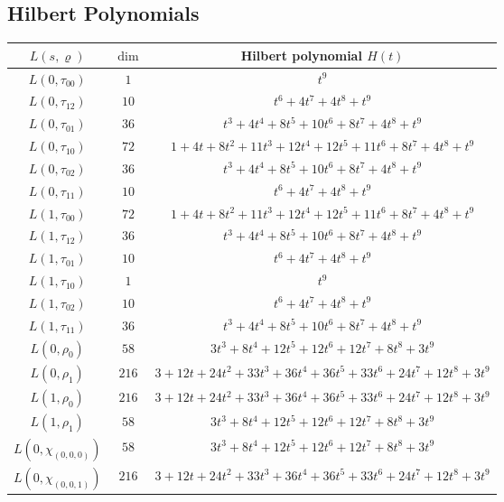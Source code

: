 \subsection{Hilbert Polynomials}

\begin{center}
\begin{tabular}{c|c|c}
\hline
$L(s,\varrho)$ & $\dim$ & Hilbert polynomial $H(t)$ \\
\hline
$L(0,\tau_{00})$ & $1$ & $t^{9}$ \\
$L(0,\tau_{12})$ & $10$ & $t^{6} + 4t^{7} + 4t^{8} + t^{9}$ \\
$L(0,\tau_{01})$ & $36$ & $t^{3} + 4t^{4} + 8t^{5} + 10t^{6} + 8t^{7} + 4t^{8} + t^{9}$ \\
$L(0,\tau_{10})$ & $72$ & $1 + 4t + 8t^{2} + 11t^{3} + 12t^{4} + 12t^{5} + 11t^{6} + 8t^{7} + 4t^{8} + t^{9}$ \\
$L(0,\tau_{02})$ & $36$ & $t^{3} + 4t^{4} + 8t^{5} + 10t^{6} + 8t^{7} + 4t^{8} + t^{9}$ \\
$L(0,\tau_{11})$ & $10$ & $t^{6} + 4t^{7} + 4t^{8} + t^{9}$ \\
$L(1,\tau_{00})$ & $72$ & $1 + 4t + 8t^{2} + 11t^{3} + 12t^{4} + 12t^{5} + 11t^{6} + 8t^{7} + 4t^{8} + t^{9}$ \\
$L(1,\tau_{12})$ & $36$ & $t^{3} + 4t^{4} + 8t^{5} + 10t^{6} + 8t^{7} + 4t^{8} + t^{9}$ \\
$L(1,\tau_{01})$ & $10$ & $t^{6} + 4t^{7} + 4t^{8} + t^{9}$ \\
$L(1,\tau_{10})$ & $1$ & $t^{9}$ \\
$L(1,\tau_{02})$ & $10$ & $t^{6} + 4t^{7} + 4t^{8} + t^{9}$ \\
$L(1,\tau_{11})$ & $36$ & $t^{3} + 4t^{4} + 8t^{5} + 10t^{6} + 8t^{7} + 4t^{8} + t^{9}$ \\
$L(0,\rho_{0})$ & $58$ & $3t^{3} + 8t^{4} + 12t^{5} + 12t^{6} + 12t^{7} + 8t^{8} + 3t^{9}$ \\
$L(0,\rho_{1})$ & $216$ & $3 + 12t + 24t^{2} + 33t^{3} + 36t^{4} + 36t^{5} + 33t^{6} + 24t^{7} + 12t^{8} + 3t^{9}$ \\
$L(1,\rho_{0})$ & $216$ & $3 + 12t + 24t^{2} + 33t^{3} + 36t^{4} + 36t^{5} + 33t^{6} + 24t^{7} + 12t^{8} + 3t^{9}$ \\
$L(1,\rho_{1})$ & $58$ & $3t^{3} + 8t^{4} + 12t^{5} + 12t^{6} + 12t^{7} + 8t^{8} + 3t^{9}$ \\
$L(0,\chi_{(0,0,0)})$ & $58$ & $3t^{3} + 8t^{4} + 12t^{5} + 12t^{6} + 12t^{7} + 8t^{8} + 3t^{9}$ \\
$L(0,\chi_{(0,0,1)})$ & $216$ & $3 + 12t + 24t^{2} + 33t^{3} + 36t^{4} + 36t^{5} + 33t^{6} + 24t^{7} + 12t^{8} + 3t^{9}$ \\

\end{tabular}
\end{center}
